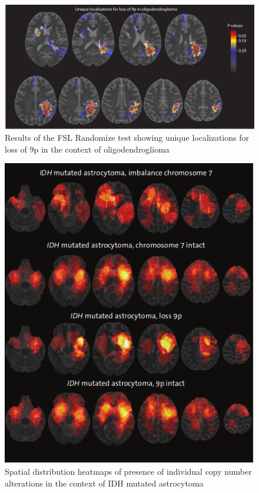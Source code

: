 \begin{figure}[htbp]
    \centering
    \includegraphics[width=\textwidth]{Figures/p_value_9p.png}
    \caption{Results of the FSL Randomize test showing unique localizations for loss of 9p in the context of oligodendroglioma}\label{fig:LGG_location_p_value_9p}
\end{figure}

\begin{figure}[htbp]
    \centering
    \includegraphics[width=\textwidth]{Figures/heatmap_chromosome_7_9.png}
    \caption{Spatial distribution heatmaps of presence of individual copy number alterations in the context of IDH mutated astrocytoma}\label{fig:LGG_location_heatmap_chromosome_7_9}
\end{figure}

